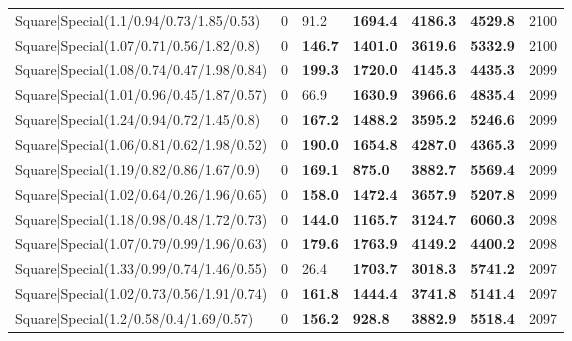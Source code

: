 \begin{tabular}{lrllllr}
 Square|Special(1.1/0.94/0.73/1.85/0.53)                       &             0   & 91.2           & \textbf{1694.4} & \textbf{4186.3} & \textbf{4529.8} &         2100 \\
 Square|Special(1.07/0.71/0.56/1.82/0.8)                       &             0   & \textbf{146.7} & \textbf{1401.0} & \textbf{3619.6} & \textbf{5332.9} &         2100 \\
 Square|Special(1.08/0.74/0.47/1.98/0.84)                      &             0   & \textbf{199.3} & \textbf{1720.0} & \textbf{4145.3} & \textbf{4435.3} &         2099 \\
 Square|Special(1.01/0.96/0.45/1.87/0.57)                      &             0   & 66.9           & \textbf{1630.9} & \textbf{3966.6} & \textbf{4835.4} &         2099 \\
 Square|Special(1.24/0.94/0.72/1.45/0.8)                       &             0   & \textbf{167.2} & \textbf{1488.2} & \textbf{3595.2} & \textbf{5246.6} &         2099 \\
 Square|Special(1.06/0.81/0.62/1.98/0.52)                      &             0   & \textbf{190.0} & \textbf{1654.8} & \textbf{4287.0} & \textbf{4365.3} &         2099 \\
 Square|Special(1.19/0.82/0.86/1.67/0.9)                       &             0   & \textbf{169.1} & \textbf{875.0}  & \textbf{3882.7} & \textbf{5569.4} &         2099 \\
 Square|Special(1.02/0.64/0.26/1.96/0.65)                      &             0   & \textbf{158.0} & \textbf{1472.4} & \textbf{3657.9} & \textbf{5207.8} &         2099 \\
 Square|Special(1.18/0.98/0.48/1.72/0.73)                      &             0   & \textbf{144.0} & \textbf{1165.7} & \textbf{3124.7} & \textbf{6060.3} &         2098 \\
 Square|Special(1.07/0.79/0.99/1.96/0.63)                      &             0   & \textbf{179.6} & \textbf{1763.9} & \textbf{4149.2} & \textbf{4400.2} &         2098 \\
 Square|Special(1.33/0.99/0.74/1.46/0.55)                      &             0   & 26.4           & \textbf{1703.7} & \textbf{3018.3} & \textbf{5741.2} &         2097 \\
 Square|Special(1.02/0.73/0.56/1.91/0.74)                      &             0   & \textbf{161.8} & \textbf{1444.4} & \textbf{3741.8} & \textbf{5141.4} &         2097 \\
 Square|Special(1.2/0.58/0.4/1.69/0.57)                        &             0   & \textbf{156.2} & \textbf{928.8}  & \textbf{3882.9} & \textbf{5518.4} &         2097 \\

\end{tabular}
